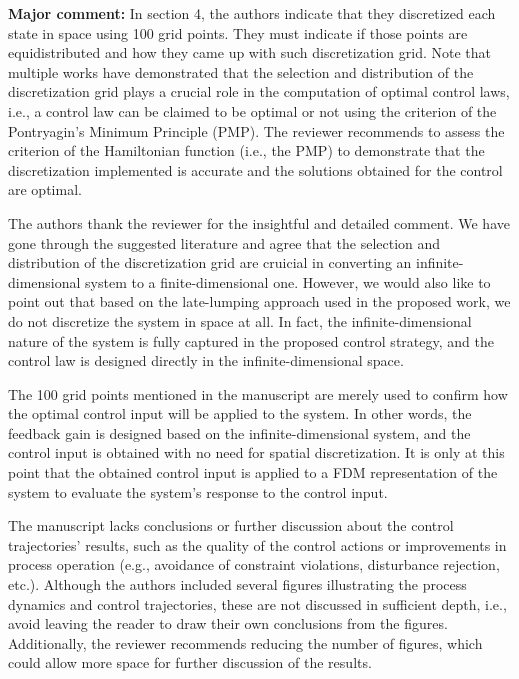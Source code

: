 \documentclass[12pt,answers]{exam}
\begin{document}
\begin{questions}

    \question \textbf{Major comment: } In section 4, the authors indicate that they discretized each state in space using 100 grid points. They must indicate if those points are equidistributed and how they came up with such discretization grid. Note that multiple works \cite{palma2023selection, assassa2016optimality, chen2014bilevel} have demonstrated that the selection and distribution of the discretization grid plays a crucial role in the computation of optimal control laws, i.e., a control law can be claimed to be optimal or not using the criterion of the Pontryagin's Minimum Principle (PMP). The reviewer recommends to assess the criterion of the Hamiltonian function (i.e., the PMP) to demonstrate that the discretization implemented is accurate and the solutions obtained for the control are optimal.

    \begin{solutionorbox} \label{comment:} \label{comment:3_1}
        The authors thank the reviewer for the insightful and detailed comment. We have gone through the suggested literature and agree that the selection and distribution of the discretization grid are cruicial in converting an infinite-dimensional system to a finite-dimensional one. However, we would also like to point out that based on the late-lumping approach used in the proposed work, we do not discretize the system in space at all. In fact, the infinite-dimensional nature of the system is fully captured in the proposed control strategy, and the control law is designed directly in the infinite-dimensional space.

        The 100 grid points mentioned in the manuscript are merely used to confirm how the optimal control input will be applied to the system. In other words, the feedback gain is designed based on the infinite-dimensional system, and the control input is obtained with no need for spatial discretization. It is only at this point that the obtained control input is applied to a FDM representation of the system to evaluate the system's response to the control input.
    \end{solutionorbox}


    \question The manuscript lacks conclusions or further discussion about the control trajectories' results, such as the quality of the control actions or improvements in process operation (e.g., avoidance of constraint violations, disturbance rejection, etc.). Although the authors included several figures illustrating the process dynamics and control trajectories, these are not discussed in sufficient depth, i.e., avoid leaving the reader to draw their own conclusions from the figures. Additionally, the reviewer recommends reducing the number of figures, which could allow more space for further discussion of the results.


\end{questions}
\end{document}

